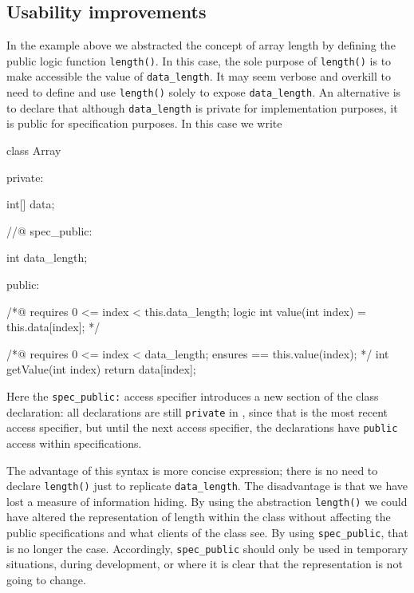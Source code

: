 \subsection{Usability improvements}

In the example above we abstracted the concept of array length by defining the public logic function \lstinline|length()|. 
In this case, the sole purpose of \lstinline|length()| is to make accessible the value of \lstinline|data_length|. It may seem verbose and overkill to need to define and use \lstinline|length()|  solely to expose \lstinline|data_length|. An alternative is to declare
that although \lstinline|data_length| is private for \lang{} implementation purposes, it is public for specification purposes.
In this case we write

\begin{listing-nonumber}
class Array {
	
  private:
	
	int[] data;
	
  //@ spec_public:
  
	int data_length;
	
  public:
	
	/*@
	   requires 0 <= index < this.data_length;
	   logic int value(int index) = this.data[index]; 
	*/
	
	/*@ 
	   requires 0 <= index < data_length;
	   ensures \result == this.value(index);
	*/
	int getValue(int index) {
		return data[index];
	}	
}
\end{listing-nonumber}

Here the \lstinline|spec_public:| access specifier introduces a new section of the class declaration: all declarations are still 
\lstinline|private| in \lang{}, since that is the most recent \lang{} access specifier, but until the next access specifier, the declarations have \lstinline|public| access within specifications. 

The advantage of this syntax is more concise expression; there is no need to declare \lstinline|length()| just to replicate \lstinline|data_length|.
The disadvantage is that we have lost a measure of information hiding. By using the abstraction \lstinline|length()| we could
have altered the representation of length within the class without affecting the public specifications and what clients of the class see.
By using \lstinline|spec_public|, that is no longer the case.
Accordingly, \lstinline|spec_public| should only be used in temporary situations, during development, or where it is clear that the representation is not going to change.

